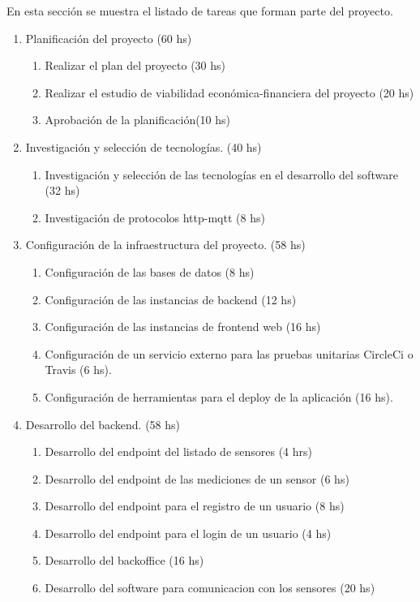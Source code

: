 \documentclass[
11pt, %
]{charter}
\begin{document}
En esta sección se muestra el listado de tareas que forman parte del proyecto.
\begin{enumerate}
\item Planificación del proyecto (60 hs)
	\begin{enumerate}
	\item Realizar el plan del proyecto (30 hs)
	\item Realizar el estudio de viabilidad económica-financiera del proyecto (20 hs)
	\item Aprobación de la planificación(10 hs)
	\end{enumerate}
\item Investigación y selección de tecnologías. (40 hs)
	\begin{enumerate}
	\item Investigación y selección de las tecnologías en el desarrollo del software (32 hs)
	\item Investigación de protocolos http-mqtt (8 hs)
	\end{enumerate}
\item Configuración de la infraestructura del proyecto. (58 hs)
	\begin{enumerate}
	\item Configuración de las bases de datos (8 hs)
	\item Configuración de las instancias de backend (12 hs)
	\item Configuración de las instancias de frontend web (16 hs)
	\item Configuración de un servicio externo para las pruebas unitarias CircleCi o Travis (6 hs).
	\item Configuración de herramientas para el deploy de la aplicación (16 hs).
	\end{enumerate}
\item Desarrollo del backend. (58 hs)
	\begin{enumerate}
	\item Desarrollo del endpoint del listado de sensores (4 hrs)
	\item Desarrollo del endpoint de las mediciones de un sensor  (6 hs)
	\item Desarrollo del endpoint para el registro de un usuario (8 hs)
	\item Desarrollo del endpoint para el login de un usuario  (4 hs)
	\item Desarrollo del backoffice (16 hs)
	\item Desarrollo del software para comunicacion con los sensores (20 hs)
	\end{enumerate}

\end{enumerate}
\end{document}
